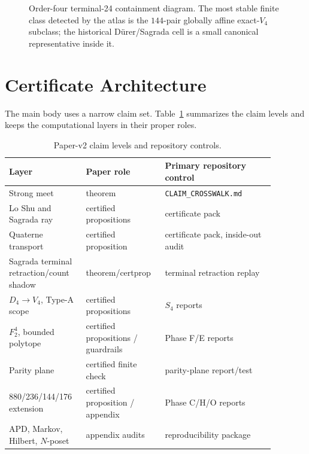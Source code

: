 \documentclass[11pt,a4paper]{article}
\theoremstyle{definition}
\theoremstyle{remark}
\newcommand{\Durer}{D\"urer\xspace}
\begin{document}
\begin{figure}[htbp]
\centering
\fbox{\begin{minipage}{0.86\linewidth}
\[
\begin{array}{rcl}
236 & = & 176 \sqcup 60
      \quad\text{terminal-24 records split into main and outside-main}\\
176 & = & 144 \sqcup 32
      \quad\text{main class split into exact }V_4\text{ and extras}\\
144 & \supset & 8
      \quad\text{the historical \Durer/Sagrada quotient cell.}
\end{array}
\]
\end{minipage}}
\caption{Order-four terminal-24 containment diagram.  The most stable finite
class detected by the atlas is the \(144\)-pair globally affine exact-\(V_4\)
subclass; the historical
\Durer/Sagrada cell is a small canonical representative inside it.}
\label{fig:order4-containment}
\end{figure}

\section{Certificate Architecture}
\label{sec:certificates}

The main body uses a narrow claim set.  Table~\ref{tab:claim-map} summarizes
the claim levels and keeps the computational layers in their proper roles.

\begin{table}[htbp]
\centering
\begin{tabular}{p{0.25\linewidth}p{0.25\linewidth}p{0.38\linewidth}}
\toprule
Layer & Paper role & Primary repository control\\
\midrule
Strong meet & theorem & \texttt{CLAIM\_CROSSWALK.md}\\
Lo Shu and Sagrada ray & certified propositions & certificate pack\\
Quaterne transport & certified proposition & certificate pack, inside-out audit\\
Sagrada terminal retraction/count shadow & theorem/certprop & terminal retraction replay\\
\(D_4\to V_4\), Type-A scope & certified propositions & \(S_4\) reports\\
\(F_2^4\), bounded polytope & certified propositions / guardrails & Phase F/E reports\\
Parity plane & certified finite check & parity-plane report/test\\
880/236/144/176 extension & certified proposition / appendix & Phase C/H/O reports\\
APD, Markov, Hilbert, \(N\)-poset & appendix audits & reproducibility package\\
\bottomrule
\end{tabular}
\caption{Paper-v2 claim levels and repository controls.}
\label{tab:claim-map}
\end{table}
\end{document}
